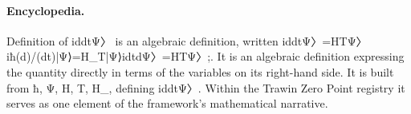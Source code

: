 \paragraph{Encyclopedia.}
Definition of iddtΨ〉 is an algebraic definition, written iddtΨ〉=HTΨ〉iħ(d)/(dt)|Ψ⟩=H\_T|Ψ⟩idtdΨ〉=HTΨ〉;. It is an algebraic definition expressing the quantity directly in terms of the variables on its right-hand side. It is built from ħ, Ψ, H, T, H\_, defining iddtΨ〉. Within the Trawin Zero Point registry it serves as one element of the framework's mathematical narrative.
